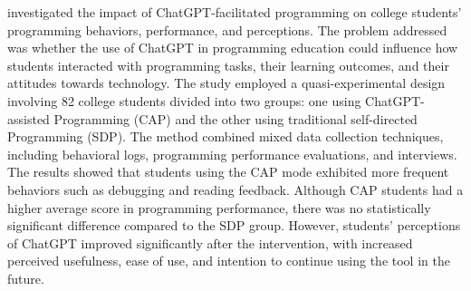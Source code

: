 \documentclass[a4paper,twoside]{article}
\begin{document}
\cite{Boudouaia24} investigated the impact of ChatGPT-facilitated programming on
college students’ programming behaviors, performance, and perceptions. The
problem addressed was whether the use of ChatGPT in programming education could
influence how students interacted with programming tasks, their learning
outcomes, and their attitudes towards technology. The study employed a
quasi-experimental design involving 82 college students divided into two groups:
one using ChatGPT-assisted Programming (CAP) and the other using traditional
self-directed Programming (SDP). The method combined mixed data collection
techniques, including behavioral logs, programming performance evaluations, and
interviews. The results showed that students using the CAP mode exhibited more
frequent behaviors such as debugging and reading feedback. Although CAP students
had a higher average score in programming performance, there was no
statistically significant difference compared to the SDP group. However,
students’ perceptions of ChatGPT improved significantly after the intervention,
with increased perceived usefulness, ease of use, and intention to continue
using the tool in the future.
\end{document}
